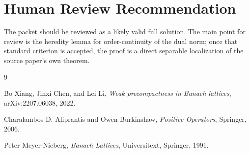 \documentclass[11pt]{article}
\begin{document}
\section*{Human Review Recommendation}

The packet should be reviewed as a likely valid full solution. The main point
for review is the heredity lemma for order-continuity of the dual norm; once
that standard criterion is accepted, the proof is a direct separable
localization of the source paper's own theorem.

\begin{thebibliography}{9}

Bo Xiang, Jinxi Chen, and Lei Li,
\emph{Weak precompactness in Banach lattices},
arXiv:2207.06038, 2022.

Charalambos D. Aliprantis and Owen Burkinshaw,
\emph{Positive Operators},
Springer, 2006.

Peter Meyer-Nieberg,
\emph{Banach Lattices},
Universitext, Springer, 1991.

\end{thebibliography}
\end{document}
